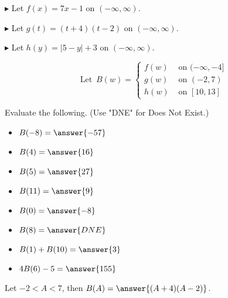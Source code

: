 \documentclass{ximera}
\author{Lee Wayand}
\begin{document}
$\blacktriangleright$ Let $f(x) = 7x - 1$ on $(-\infty, \infty)$.


$\blacktriangleright$ Let $g(t) = (t+4)(t-2)$ on $(-\infty, \infty)$.


$\blacktriangleright$ Let $h(y) = |5-y|+3$ on $(-\infty, \infty)$.




\[
\text{ Let } \, B(w) = 
\begin{cases}
  f(w) & \text{ on } (-\infty,-4] \\
  g(w) & \text{ on } (-2,7) \\
  h(w) & \text{ on } [10, 13]
\end{cases}
\]













\begin{exercise}

Evaluate the following. (Use "DNE" for Does Not Exist.)


\begin{itemize}
\item $B(-8) = \answer{-57}$  
\item $B(4) = \answer{16}$ 
\item $B(5) = \answer{27}$ 
\item $B(11) = \answer{9}$ 
\item $B(0) = \answer{-8}$ 
\item $B(8) = \answer{DNE}$ 
\item $B(1) + B(10) = \answer{3}$ 
\item $4 B(6) - 5 = \answer{155}$ 
\end{itemize}

\end{exercise}








\begin{exercise}

Let $-2 < A < 7$, then $B(A) = \answer{(A+4)(A-2)}$.


\end{exercise}
\end{document}
